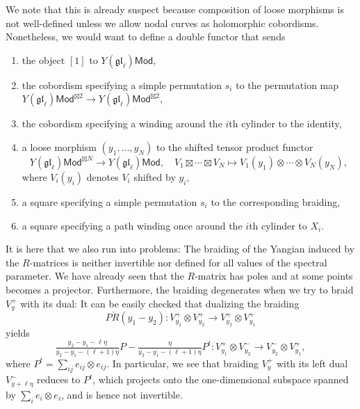 \documentclass[11pt]{report}
\theoremstyle{definition}
\theoremstyle{remark}
\theoremstyle{remark}
\begin{document}
We note that this is already suspect because composition of loose morphisms is not well-defined unless we allow nodal curves as holomorphic cobordisms. Nonetheless, we would want to define a double functor that sends
\begin{enumerate}[label=(\roman*)]
\item the object $[1]$ to $Y(\mathfrak{gl}_\ell)\mathsf{Mod}$,
\item the cobordism specifying a simple permutation $s_i$ to the permutation map $Y(\mathfrak{gl}_\ell)\mathsf{Mod}^{\boxtimes 2} \to Y(\mathfrak{gl}_\ell)\mathsf{Mod}^{\boxtimes 2}$,
\item the cobordism specifying a winding around the $i$th cylinder to the identity,
\item a loose morphism $(y_1,...,y_N)$ to the shifted tensor product functor
\begin{equation*}
Y(\mathfrak{gl}_\ell)\mathsf{Mod}^{\boxtimes N} \to Y(\mathfrak{gl}_\ell)\mathsf{Mod}, \quad V_1 \boxtimes \cdots \boxtimes V_N \mapsto V_1(y_1) \otimes \cdots \otimes V_N(y_N),
\end{equation*}
where $V_i(y_i)$ denotes $V_i$ shifted by $y_i$,
\item a square specifying a simple permutation $s_i$ to the corresponding braiding,
\item a square specifying a path winding once around the $i$th cylinder to $X_i$.
\end{enumerate}
It is here that we also run into problems: The braiding of the Yangian induced by the $R$-matrices is neither invertible nor defined for all values of the spectral parameter. We have already seen that the $R$-matrix has poles and at some points becomes a projector. Furthermore, the braiding degenerates when we try to braid $V_y^+$ with its dual: It can be easily checked that dualizing the braiding
\begin{equation*}
P \check R(y_1-y_2): V_{y_1}^+ \otimes V_{y_2}^+ \to V_{y_2}^+ \otimes V_{y_1}^+
\end{equation*}
yields
\begin{equation*}
\tfrac{y_2-y_1-\ell\eta}{y_2-y_1-(\ell+1)\eta} P - \tfrac{\eta}{y_2-y_1-(\ell+1)\eta} P^t: V_{y_1}^+ \otimes V_{y_2}^- \to V_{y_2}^- \otimes V_{y_1}^+,
\end{equation*}
where $P^t = \sum_{ij} e_{ij} \otimes e_{ij}$. In particular, we see that braiding $V_y^+$ with its left dual $V_{y+\ell\eta}^-$ reduces to $P^t$, which projects onto the one-dimensional subspace spanned by $\sum_i e_i \otimes e_i$, and is hence not invertible.
\end{document}
